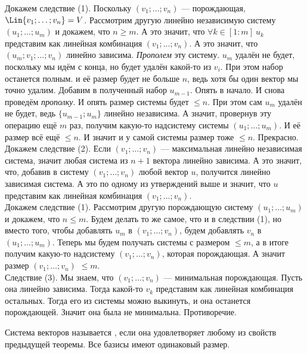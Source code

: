 \documentclass{article}
\begin{document}
\begin{itemize}
\begin{Proof}
            Докажем следствие (1). Поскольку $(v_1;\ldots;v_n)$ --- порождающая, $\Lin\{v_1;\ldots;v_n\}=V$. Рассмотрим другую линейно независимую систему $(u_1;\ldots;u_m)$ и докажем, что $n\geqslant m$. А это значит, что $\forall k\in[1:m]~u_k$ представим как линейная комбинация $(v_1;\ldots;v_n)$. А это значит, что $(u_m;v_1;\ldots;v_n)$ линейно зависима. \textit{Прополем} эту систему. $u_m$ удалён не будет, поскольку мы идём с конца, но будет удалён какой-то из $v_i$. При этом набор останется полным. и её размер будет не больше $n$, ведь хотя бы один вектор мы точно удалим. Добавим в полученный набор $u_{m-1}$. Опять в начало. И снова проведём \textit{прополку}. И опять размер системы будет $\leqslant n$. При этом сам $u_m$ удалён не будет, ведь $\{u_{m-1};u_m\}$ линейно независима. А значит, провернув эту операцию ещё $m$ раз, получим какую-то надсистему системы $(u_1;\ldots;u_m)$. И её размер всё ещё $\leqslant n$. И значит и у самой системы размер тоже $\leqslant n$. Прекрасно.\\
            Докажем следствие (2). Если $(v_1;\ldots;v_n)$ --- максимальная линейно независимая система, значит любая система из $n+1$ вектора линейно зависима. А это значит, что, добавив в систему $(v_1;\ldots;v_n)$ любой вектор $u$, получится линейно зависимая система. А это по одному из утверждений выше и значит, что $u$ представим как линейная комбинация $(v_1;\ldots;v_n)$.\\
            Докажем следствие (1). Рассмотрим другую порождающую систему $(u_1;\ldots;u_m)$ и докажем, что $n\leqslant m$. Будем делать то же самое, что и в следствии (1), но вместо того, чтобы добавлять $u_m$ в $(v_1;\ldots;v_n)$, будем добавлять $v_n$ в $(u_1;\ldots;u_m)$. Теперь мы будем получать системы с размером $\leqslant m$, а в итоге получим какую-то надсистему $(v_1;\ldots;v_n)$, которая порождающая. А значит размер $(v_1;\ldots;v_n)$ $\leqslant m$.\\
            Следствие (3). Мы знаем, что $(v_1;\ldots;v_n)$ --- минимальная порождающая. Пусть она линейно зависима. Тогда какой-то $v_k$ представим как линейная комбинация остальных. Тогда его из системы можно выкинуть, и она останется порождающей. Значит она была не минимальна. Противоречие.
        \end{Proof}
        \dfn Система векторов называется , если она удовлетворяет любому из свойств предыдущей теоремы.
        \thm Все базисы имеют одинаковый размер.
        \begin{Proof}

\end{Proof}
\end{itemize}
\end{document}
